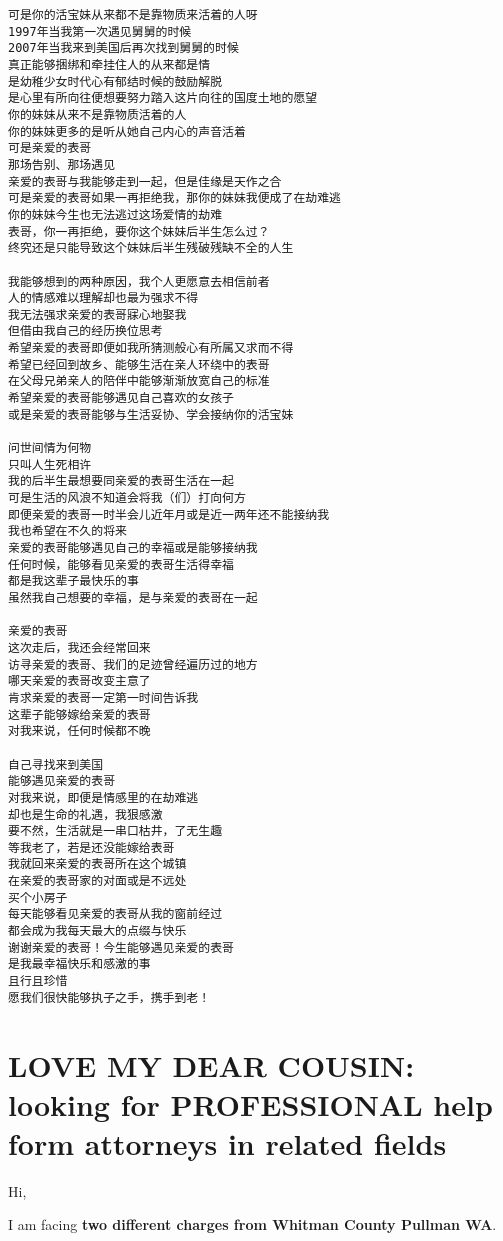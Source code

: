\documentclass[9pt, b5paaper]{book}
\begin{document}
\begin{itemize}
\begin{verbatim}
可是你的活宝妹从来都不是靠物质来活着的人呀
1997年当我第一次遇见舅舅的时候
2007年当我来到美国后再次找到舅舅的时候
真正能够捆绑和牵挂住人的从来都是情
是幼稚少女时代心有郁结时候的鼓励解脱
是心里有所向往便想要努力踏入这片向往的国度土地的愿望
你的妹妹从来不是靠物质活着的人
你的妹妹更多的是听从她自己内心的声音活着
可是亲爱的表哥
那场告别、那场遇见
亲爱的表哥与我能够走到一起，但是佳缘是天作之合
可是亲爱的表哥如果一再拒绝我，那你的妹妹我便成了在劫难逃
你的妹妹今生也无法逃过这场爱情的劫难
表哥，你一再拒绝，要你这个妹妹后半生怎么过？
终究还是只能导致这个妹妹后半生残破残缺不全的人生

我能够想到的两种原因，我个人更愿意去相信前者
人的情感难以理解却也最为强求不得
我无法强求亲爱的表哥寐心地娶我
但借由我自己的经历换位思考
希望亲爱的表哥即便如我所猜测般心有所属又求而不得
希望已经回到故乡、能够生活在亲人环绕中的表哥
在父母兄弟亲人的陪伴中能够渐渐放宽自己的标准
希望亲爱的表哥能够遇见自己喜欢的女孩子
或是亲爱的表哥能够与生活妥协、学会接纳你的活宝妹

问世间情为何物
只叫人生死相许
我的后半生最想要同亲爱的表哥生活在一起
可是生活的风浪不知道会将我（们）打向何方
即便亲爱的表哥一时半会儿近年月或是近一两年还不能接纳我
我也希望在不久的将来
亲爱的表哥能够遇见自己的幸福或是能够接纳我
任何时候，能够看见亲爱的表哥生活得幸福
都是我这辈子最快乐的事
虽然我自己想要的幸福，是与亲爱的表哥在一起

亲爱的表哥
这次走后，我还会经常回来
访寻亲爱的表哥、我们的足迹曾经遍历过的地方
哪天亲爱的表哥改变主意了
肯求亲爱的表哥一定第一时间告诉我
这辈子能够嫁给亲爱的表哥
对我来说，任何时候都不晚

自己寻找来到美国
能够遇见亲爱的表哥
对我来说，即便是情感里的在劫难逃
却也是生命的礼遇，我狠感激
要不然，生活就是一串口枯井，了无生趣
等我老了，若是还没能嫁给表哥
我就回来亲爱的表哥所在这个城镇
在亲爱的表哥家的对面或是不远处
买个小房子
每天能够看见亲爱的表哥从我的窗前经过
都会成为我每天最大的点缀与快乐
谢谢亲爱的表哥！今生能够遇见亲爱的表哥
是我最幸福快乐和感激的事
且行且珍惜
愿我们很快能够执子之手，携手到老！
\end{verbatim}
\end{itemize}

\chapter{LOVE MY DEAR COUSIN: looking for PROFESSIONAL help form attorneys in related fields}
\label{sec-4}
Hi, 

I am facing \textbf{two different charges from Whitman
County Pullman WA}. 
\end{document}
